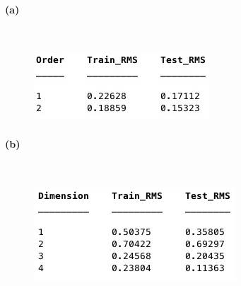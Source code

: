 \documentclass[]{article}
\begin{document}
	\paragraph{(a)}\mbox{}\\
	
	\begin{figure}[H]
		\centering
		\includegraphics[width=0.8\linewidth]{3a1}
		\caption{}
		\label{fig:3a1}
	\end{figure}

	\paragraph{(b)}\mbox{}\\
	
	\begin{figure}[H]
		\centering
		\includegraphics[width=0.8\linewidth]{3b1}
		\caption{}
		\label{fig:3b1}
	\end{figure}	
\end{document}
